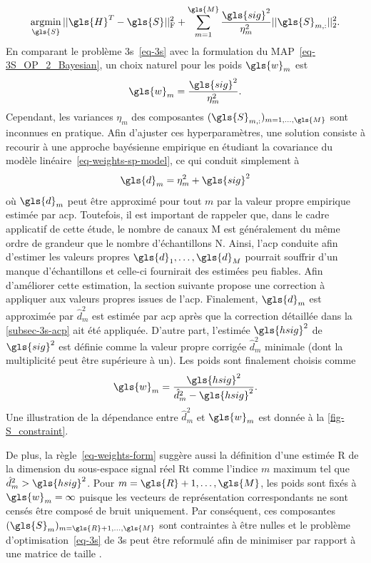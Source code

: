\begin{equation}
\argmin_{\gls{S}} \frobnorm{\gls{H}^T-\gls{S}} + \sum_{m = 1}^{\gls{M}} \frac{\gls{sig}^2}{\eta^2_m}\twonorm{\gls{S}_{m,:}}.
\label{eq-3S_OP_2_Bayesian}
\end{equation}
En comparant le problème \gls{3s}~\eqref{eq-3s} avec la formulation du MAP~\eqref{eq-3S_OP_2_Bayesian}, un choix naturel pour les poids $\gls{w}_m$ est
\begin{equation}
    \gls{w}_m = \frac{\gls{sig}^2}{\eta_m^2}. 
\end{equation}
Cependant, les variances $\eta_m$ des composantes $(\gls{S}_{m, :})_{m=1,\dots,\gls{M}}$ sont inconnues en pratique. Afin d'ajuster ces hyperparamètres, une solution consiste à recourir à une approche bayésienne empirique en étudiant la covariance du modèle linéaire~\eqref{eq-weights-sp-model}, ce qui conduit simplement à
\begin{equation}
    \gls{d}_m = \eta_m^2 + \gls{sig}^2
\end{equation}
où $\gls{d}_m$ peut être approximé pour tout $m$ par la valeur propre empirique estimée par \gls{acp}. Toutefois, il est important de rappeler que, dans le cadre applicatif de cette étude, le nombre de canaux \gls{M} est généralement du même ordre de grandeur que le nombre d'échantillons \gls{N}. Ainsi, l'\gls{acp} conduite afin d'estimer les valeurs propres $\gls{d}_1, \dots, \gls{d}_M$ pourrait souffrir d'un manque d'échantillons et celle-ci fournirait des estimées  peu fiables. Afin d'améliorer cette estimation, la section suivante propose une correction à appliquer aux valeurs propres issues de l'\gls{acp}. Finalement, $\gls{d}_m$ est approximée par $\hat{d}_m^2$ est estimée par \gls{acp} après que la correction détaillée dans la \cref{subsec-3s-acp} ait été appliquée. D'autre part, l'estimée $\gls{hsig}^2$ de $\gls{sig}^2$ est définie comme la valeur propre corrigée $\hat{d}_m^2$ minimale (dont la multiplicité peut être supérieure à un). Les poids sont finalement choisis comme
\begin{equation}\label{eq-weights-form}
    \gls{w}_m = \frac{\gls{hsig}^2}{\hat{d}_m^2 - \gls{hsig}^2}.
\end{equation}
Une illustration de la dépendance entre $\hat{d}_m^2$ et $\gls{w}_m$ est donnée à la \cref{fig-S_constraint}. 

De plus, la règle~\eqref{eq-weights-form} suggère aussi la définition d'une estimée \gls{R} de la dimension du sous-espace signal réel \gls{Rt} comme l'indice $m$ maximum tel que $\hat{d}_{m}^2 > \gls{hsig}^2$. Pour $m=\gls{R}+1, \dots, \gls{M}$, les poids sont fixés  à $\gls{w}_m = \infty$ puisque les vecteurs de représentation correspondants ne sont censés être composé de bruit uniquement. Par conséquent, ces composantes $(\gls{S}_m)_{m=\gls{R}+1,\dots,\gls{M}}$ sont contraintes à être nulles et le problème d'optimisation~\eqref{eq-3s} de \gls{3s} peut être reformulé afin de minimiser par rapport à une matrice de taille .

